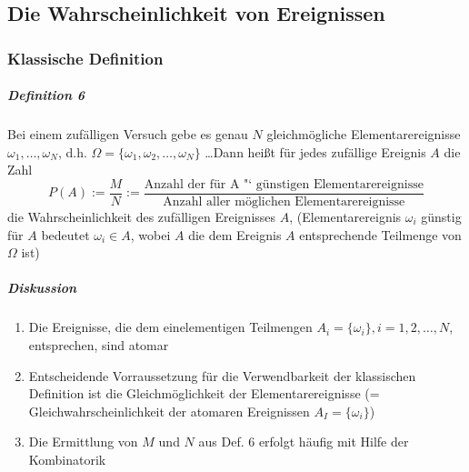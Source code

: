 \documentclass[a4paper]{scrartcl}
\begin{document}
\subsection{Die Wahrscheinlichkeit von Ereignissen}
\subsubsection{Klassische Definition}
\subparagraph{Definition 6} Bei einem zufälligen Versuch gebe es genau $N$ gleichmögliche Elementarereignisse $\omega_1,\dots ,\omega_N$, d.h. $\Omega = \{\omega_1,\omega_2,\dots,\omega_N\}$ \dots Dann heißt für jedes zufällige Ereignis $A$ die Zahl
\[ P(A) := \frac{M}{N} := \frac{\text{Anzahl der für A "` günstigen Elementarereignisse}}{\text{Anzahl aller möglichen Elementarereignisse}} \]
die Wahrscheinlichkeit des zufälligen Ereignisses $A$, (Elementarereignis $\omega_i$ günstig für $A$ bedeutet $\omega_i \in A$, wobei $A$ die dem Ereignis $A$ entsprechende Teilmenge von $\Omega$ ist)

\subparagraph{Diskussion} 
\begin{enumerate}
\item Die Ereignisse, die dem einelementigen Teilmengen $A_i = \{ \omega_i \}, i = 1,2,\dots,N$, entsprechen, sind atomar
\item Entscheidende Vorraussetzung für die Verwendbarkeit der klassischen Definition ist die Gleichmöglichkeit der Elementarereignisse (= Gleichwahrscheinlichkeit der atomaren Ereignissen $A_I = \{ \omega_i \}$)
\item Die Ermittlung von $M$ und $N$ aus Def. 6 erfolgt häufig mit Hilfe der Kombinatorik
\end{enumerate}
\end{document}
